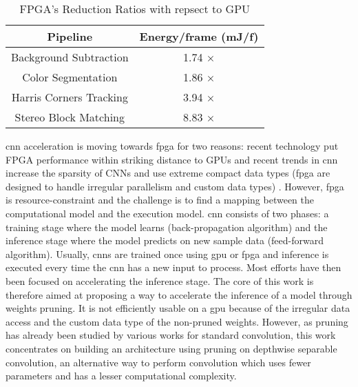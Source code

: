 \begin{table}
    \center
    \begin{tabular}{|c|c|}
        \hline
        Pipeline & Energy/frame (mJ/f) \\
        \hline
        Background Subtraction & 1.74 $\times$\\
        \hline
        Color Segmentation & 1.86 $\times$ \\
        \hline
        Harris Corners Tracking & 3.94 $\times$ \\
        \hline
        Stereo Block Matching & 8.83 $\times$ \\
        \hline
    \end{tabular}
    \caption{FPGA’s Reduction Ratios with repsect to GPU \cite{qasaimeh_comparing_2019}}
    \label{tab:benchener}
\end{table} \newline \newline
%
\acrshort{cnn} acceleration is moving towards \acrshort{fpga} for two reasons: recent technology put FPGA performance within striking distance to GPUs and recent trends in \acrshort{cnn} increase the sparsity of CNNs and use extreme compact data types (\acrshort{fpga} are designed to handle irregular parallelism and custom data types) \cite{abdelouahab_accelerating_2018}. However, \acrshort{fpga} is resource-constraint and the challenge is to find a mapping between the computational model and the execution model. \newline \newline
%
\acrshort{cnn} consists of two phases: a training stage where the model learns (back-propagation algorithm) and the inference stage where the model predicts on new sample data (feed-forward algorithm). Usually, \acrshort{cnn}s are trained once using \acrshort{gpu} or \acrshort{fpga} and inference is executed every time the \acrshort{cnn} has a new input to process. Most efforts have then been focused on accelerating the inference stage. The core of this work is therefore aimed at proposing a way to accelerate the inference of a model through weights pruning. It is not efficiently usable on a \acrshort{gpu} because of the irregular data access and the custom data type of the non-pruned weights. \newline \newline
%
However, as pruning has already been studied by various works for standard convolution, this work concentrates on building an architecture using pruning on depthwise separable convolution, an alternative way to perform convolution which uses fewer parameters and has a lesser computational complexity.
%
